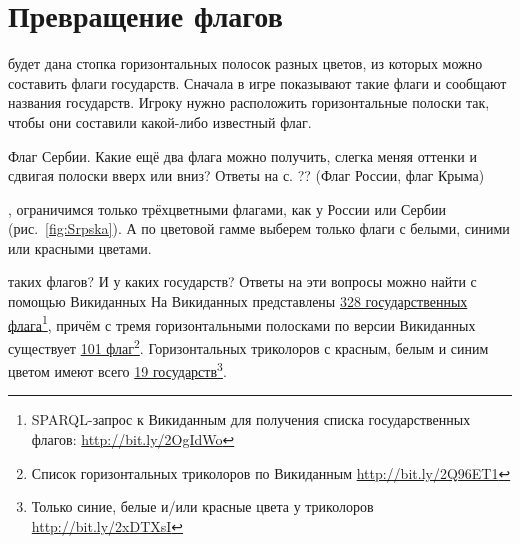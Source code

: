 \chapter{Превращение флагов}
\label{ch:draughts-moves}

 будет дана стопка горизонтальных полосок разных цветов, 
из которых можно составить флаги государств. Сначала в игре показывают такие флаги и сообщают названия государств.
Игроку нужно расположить горизонтальные полоски так, чтобы они составили какой-либо известный флаг. 

\begin{marginfigure}
{%
\setlength{\fboxsep}{0pt}%
\setlength{\fboxrule}{1pt}%
%
}%

\caption{Флаг Сербии. Какие ещё два флага можно получить, слегка меняя оттенки 
    и сдвигая полоски вверх или вниз? Ответы на с. ?? (Флаг России, флаг Крыма)}
\label{fig:Srpska}
\end{marginfigure}

, ограничимся только трёхцветными флагами, как у России 
или Сербии (рис.~\ref{fig:Srpska}).
А по цветовой гамме выберем только флаги с белыми, синими или красными цветами.

 таких флагов? И у каких государств? Ответы на эти вопросы 
можно найти с помощью Викиданных %
На Викиданных представлены \href{http://bit.ly/2OgIdWo}{328 государственных флага}\footnote[][-1cm]{
    SPARQL-запрос к Викиданным для получения списка государственных флагов: \url{http://bit.ly/2OgIdWo}
}, 
причём с тремя горизонтальными полосками по версии Викиданных 
существует \href{http://bit.ly/2Q96ET1}{101 флаг}\footnote[][-0.8cm]{
    Список горизонтальных триколоров по Викиданным
    \url{http://bit.ly/2Q96ET1}
}. 
Горизонтальных триколоров с красным, белым и синим цветом имеют всего \href{http://bit.ly/2xDTXsI}{19 государств}\footnote[][0.0cm]{
    Только синие, белые и/или красные цвета у триколоров 
    \url{http://bit.ly/2xDTXsI}
    \bigskip 
}.


